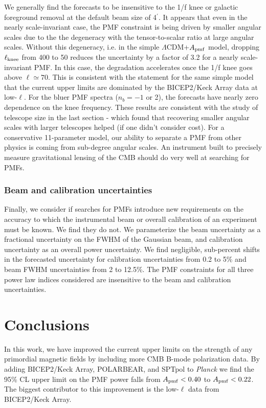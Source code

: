 \documentclass[apj]{emulateapj}
\newcommand{\apmf}{\ensuremath{A_{\rm pmf}}}
\newcommand{\lcdm}{\ensuremath{\Lambda}CDM}
\newcommand{\lknee}{\ensuremath{\ell_{\rm knee}}}
\newcommand{\planck}{{\sl Planck}}
\newcommand{\bicepkeck}{BICEP2/Keck Array}
\newcommand{\pb}{POLARBEAR}
\newcommand{\sptpol}{SPTpol}
\begin{document}
We generally find the forecasts to be insensitive to the 1/f knee or galactic foreground removal at the default beam size of 4$^\prime$. 
It appears that even in the nearly scale-invariant case, the PMF constraint is being driven by smaller angular scales due to the the degeneracy with the tensor-to-scalar ratio at large angular scales. 
Without this degeneracy, i.e. in the simple \lcdm{}+\apmf{} model, dropping \lknee{} from 400 to 50 reduces the uncertainty by a factor of 3.2 for a nearly scale-invariant PMF. 
In this case, the degradation accelerates once the 1/f knee goes above $\ell \simeq 70$. 
This is consistent with the statement for the same simple model that the current upper limits are dominated by the BICEP2/Keck Array data at low-$\ell$. 
For the bluer PMF spectra ($n_b=-1$ or 2), the forecasts have nearly zero dependence on the knee frequency. 
These results are consistent with the study of telescope size in the last section - which found that recovering smaller angular scales with larger telescopes helped (if one didn't consider cost).
For a conservative 11-parameter model, our ability to separate a PMF from other physics is coming from sub-degree angular scales. 
An instrument built to precisely measure gravitational lensing of the CMB should do very well at searching for PMFs. 


\subsubsection{Beam and calibration uncertainties}

Finally, we consider if searches for PMFs introduce new requirements on the accuracy to which the instrumental beam or overall calibration of an experiment must be known. 
We find they do not. 
We parameterize the beam uncertainty as a fractional uncertainty on the FWHM of the Gaussian beam, and calibration uncertainty as an overall power uncertainty. 
We find negligible, sub-percent shifts in the forecasted uncertainty for calibration uncertainties from 0.2 to 5\% and beam FWHM uncertainties from 2 to 12.5\%. 
The PMF constraints  for all three power law indices considered are insensitive to the beam and calibration uncertainties. 

\section{Conclusions}
\label{sec:conclusions}

In this work, we have improved the current upper limits on the strength of any primordial magnetic fields by including more CMB B-mode polarization data. 
By adding \bicepkeck{}, \pb, and \sptpol{} to \planck{} we find the 95\% CL upper limit on the PMF power falls from $\apmf < \upperAplk$ to $\apmf < \upperAall$. 
The biggest contributor to this improvement is the low-$\ell$ data from \bicepkeck{}. 
\end{document}
